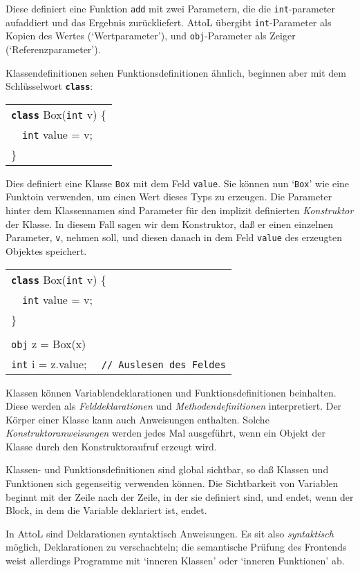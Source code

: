 \documentclass[11pt,a4paper]{article}
\newenvironment{slisting}{%
        \begin{tt}%
        \begin{tabular}{l}%
        }
        {%
        \end{tabular}%
        \end{tt}%
        }
\newcommand{\Cty}[1]{\textcolor{dblue}{\texttt{#1}}}
\newcommand{\Ccom}[1]{\textcolor{dgreen}{\texttt{#1}}}
\newcommand{\Ckw}[1]{\textbf{\texttt{#1}}}
\begin{document}
Diese definiert eine Funktion \texttt{add} mit zwei Parametern, die die
\Cty{int}-parameter aufaddiert und das Ergebnis zurückliefert.
AttoL übergibt \Cty{int}-Parameter als Kopien des Wertes (`Wertparameter'), und
\Cty{obj}-Parameter als Zeiger (`Referenzparameter').

Klassendefinitionen sehen Funktionsdefinitionen ähnlich, beginnen aber mit dem Schlüsselwort \Ckw{class}:

\begin{slisting}
\Ckw{class} Box(\Cty{int} v) \{\\
\ \ \Cty{int} value = v;\\
\}\\
\end{slisting}

Dies definiert eine Klasse \Cty{Box} mit dem Feld \texttt{value}.  Sie können nun `\Cty{Box}'
wie eine Funktoin verwenden, um einen Wert dieses Typs zu erzeugen.  Die Parameter hinter dem
Klassennamen sind Parameter für den implizit definierten \emph{Konstruktor} der Klasse.
In diesem Fall sagen wir dem Konstruktor, daß er einen einzelnen Parameter, \texttt{v}, nehmen soll, und diesen
danach in dem Feld \texttt{value} des erzeugten Objektes speichert.

\begin{slisting}
\Ckw{class} Box(\Cty{int} v) \{\\
\ \ \Cty{int} value = v;\\
\}\\
\\
\Cty{obj} z = Box(x)\\
\Cty{int} i = z.value; \ \ \Ccom{// Auslesen des Feldes} \\
\end{slisting}


Klassen können Variablendeklarationen und Funktionsdefinitionen beinhalten.
Diese werden als \emph{Felddeklarationen} und \emph{Methodendefinitionen} interpretiert.
Der Körper einer Klasse kann auch Anweisungen enthalten.  Solche \emph{Konstruktoranweisungen} werden jedes Mal ausgeführt, wenn ein Objekt der Klasse durch den Konstruktoraufruf erzeugt wird.

Klassen- und Funktionsdefinitionen sind global sichtbar, so daß Klassen und Funktionen sich gegenseitig verwenden können.
Die Sichtbarkeit von Variablen beginnt mit der Zeile nach der Zeile, in der sie definiert sind, und endet, wenn der Block, in dem die Variable deklariert ist, endet.

In AttoL sind Deklarationen syntaktisch Anweisungen.  Es sit also
\emph{syntaktisch} möglich, Deklarationen zu verschachteln; die
semantische Prüfung des Frontends weist allerdings Programme mit
`inneren Klassen' oder `inneren Funktionen' ab.
\end{document}
